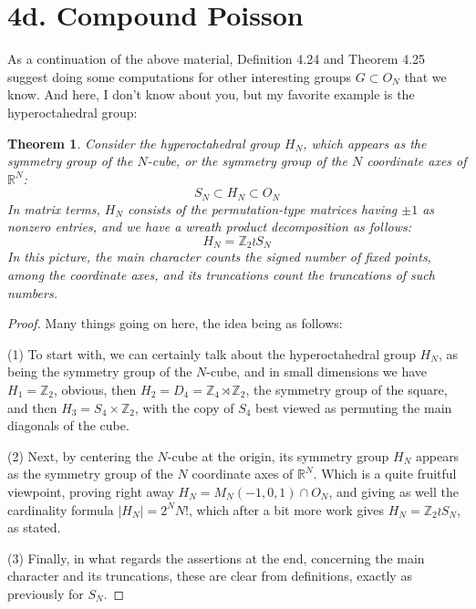 \documentclass[12pt]{amsbook}
\newtheorem{theorem}{Theorem}[chapter]
\begin{document}
\section*{4d. Compound Poisson}

As a continuation of the above material, Definition 4.24 and Theorem 4.25 suggest doing some computations for other interesting groups $G\subset O_N$ that we know. And here, I don't know about you, but my favorite example is the hyperoctahedral group:

\begin{theorem}
Consider the hyperoctahedral group $H_N$, which appears as the symmetry group of the $N$-cube, or the symmetry group of the $N$ coordinate axes of $\mathbb R^N$:
$$S_N\subset H_N\subset O_N$$
In matrix terms, $H_N$ consists of the permutation-type matrices having $\pm1$ as nonzero entries, and we have a wreath product decomposition as follows:
$$H_N=\mathbb Z_2\wr S_N$$
In this picture, the main character counts the signed number of fixed points, among the coordinate axes, and its truncations count the truncations of such numbers.
\end{theorem}

\begin{proof}
Many things going on here, the idea being as follows:

\medskip

(1) To start with, we can certainly talk about the hyperoctahedral group $H_N$, as being the symmetry group of the $N$-cube, and in small dimensions we have $H_1=\mathbb Z_2$, obvious, then $H_2=D_4=\mathbb Z_4\rtimes\mathbb Z_2$, the symmetry group of the square, and then $H_3=S_4\times\mathbb Z_2$, with the copy of $S_4$ best viewed as permuting the main diagonals of the cube.

\medskip

(2) Next, by centering the $N$-cube at the origin, its symmetry group $H_N$ appears as the symmetry group of the $N$ coordinate axes of $\mathbb R^N$. Which is a quite fruitful viewpoint, proving right away $H_N=M_N(-1,0,1)\cap O_N$, and giving as well the cardinality formula $|H_N|=2^NN!$, which after a bit more work gives $H_N=\mathbb Z_2\wr S_N$, as stated.

\medskip

(3) Finally, in what regards the assertions at the end, concerning the main character and its truncations, these are clear from definitions, exactly as previously for $S_N$.
\end{proof}
\end{document}
